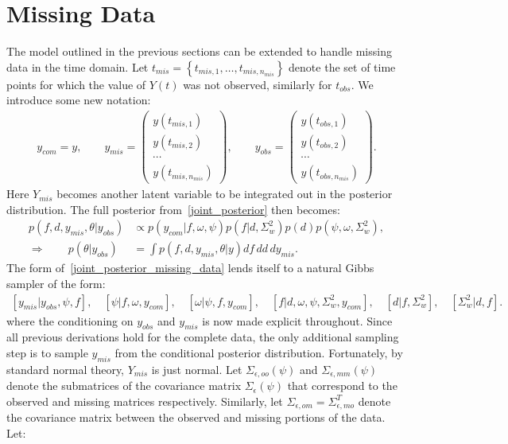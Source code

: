\documentclass[a4paper,11pt]{article}
\begin{document}
\section{Missing Data}
The model outlined in the previous sections can be extended to handle missing data in the time domain. Let $t_{mis}=\left\{t_{mis,1},\ldots,t_{mis,n_{mis}}\right\}$ denote the set of time points for which the value of $Y(t)$ was not observed, similarly for $t_{obs}$. We introduce some new notation:
\begin{align*}
  y_{com} = y , \qquad
  y_{mis} = \left(\begin{array}{c} y(t_{mis,1}) \\ y(t_{mis,2}) \\ \cdots \\ y(t_{mis,n_{mis}}) \end{array}\right) , \qquad
  y_{obs} = \left(\begin{array}{c} y(t_{obs,1}) \\ y(t_{obs,2}) \\ \cdots \\ y(t_{obs,n_{mis}}) \end{array}\right) .
\end{align*}
Here $Y_{mis}$ becomes another latent variable to be integrated out in the posterior distribution. The full posterior from~\eqref{joint_posterior} then becomes:
\begin{align}
\label{joint_posterior_missing_data} 
 p(f,d,y_{mis},\theta|y_{obs}) &\propto p(y_{com}|f,\omega,\psi)p(f|d,\Sigma^{2}_{w})p(d)p(\psi,\omega,\Sigma^{2}_{w}) ,  \\
 \Rightarrow{} \qquad p(\theta|y_{obs}) &= \int{}p(f,d,y_{mis},\theta|y)df\,dd\,dy_{mis} .
\end{align}
The form of~\eqref{joint_posterior_missing_data} lends itself to a natural Gibbs sampler of the form:
\begin{align*}
 \left[y_{mis}|y_{obs},\psi,f\right] , \quad
 \left[\psi|f,\omega,y_{com}\right] , \quad
 \left[\omega|\psi,f,y_{com}\right] , \quad
 \left[f|d,\omega,\psi,\Sigma^{2}_{w},y_{com}\right] , \quad
 \left[d|f,\Sigma^{2}_{w}\right] , \quad 
 \left[\Sigma^{2}_{w}|d,f\right] .
\end{align*}
where the conditioning on $y_{obs}$ and $y_{mis}$ is now made explicit throughout. Since all previous derivations hold for the complete data, the only additional sampling step is to sample $y_{mis}$ from the conditional posterior distribution. Fortunately, by standard normal theory, $Y_{mis}$ is just normal. Let $\Sigma_{\epsilon,oo}(\psi)$ and $\Sigma_{\epsilon,mm}(\psi)$ denote the submatrices of the covariance matrix $\Sigma_{\epsilon}(\psi)$ that correspond to the observed and missing matrices respectively. Similarly, let $\Sigma_{\epsilon,om}=\Sigma_{\epsilon,mo}^{T}$ denote the covariance matrix between the observed and missing portions of the data.  Let:
\end{document}
